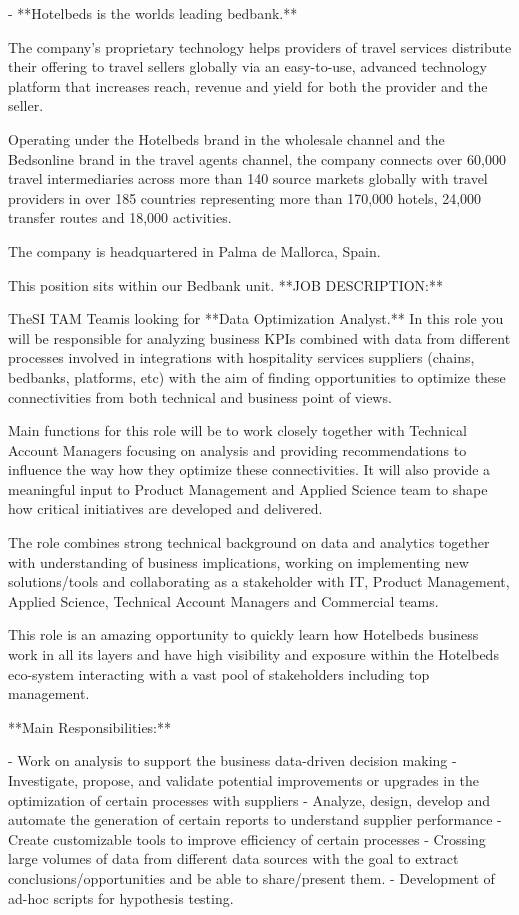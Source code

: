 - **Hotelbeds is the worlds leading bedbank.**

  The company’s proprietary technology helps providers of travel services distribute their offering to travel sellers globally via an easy-to-use, advanced technology platform that increases reach, revenue and yield for both the provider and the seller.

  Operating under the Hotelbeds brand in the wholesale channel and the Bedsonline brand in the travel agents channel, the company connects over 60,000 travel intermediaries across more than 140 source markets globally with travel providers in over 185 countries representing more than 170,000 hotels, 24,000 transfer routes and 18,000 activities.

  The company is headquartered in Palma de Mallorca, Spain.

  This position sits within our Bedbank unit. **JOB DESCRIPTION:**

  TheSI TAM Teamis looking for **Data Optimization Analyst.** In this role you will be responsible for analyzing business KPIs combined with data from different processes involved in integrations with hospitality services suppliers (chains, bedbanks, platforms, etc) with the aim of finding opportunities to optimize these connectivities from both technical and business point of views.

  Main functions for this role will be to work closely together with Technical Account Managers focusing on analysis and providing recommendations to influence the way how they optimize these connectivities. It will also provide a meaningful input to Product Management and Applied Science team to shape how critical initiatives are developed and delivered.

  The role combines strong technical background on data and analytics together with understanding of business implications, working on implementing new solutions/tools and collaborating as a stakeholder with IT, Product Management, Applied Science, Technical Account Managers and Commercial teams.

  This role is an amazing opportunity to quickly learn how Hotelbeds business work in all its layers and have high visibility and exposure within the Hotelbeds eco-system interacting with a vast pool of stakeholders including top management.

  **Main Responsibilities:**

  - Work on analysis to support the business data-driven decision making
  - Investigate, propose, and validate potential improvements or upgrades in the optimization of certain processes with suppliers
  - Analyze, design, develop and automate the generation of certain reports to understand supplier performance
  - Create customizable tools to improve efficiency of certain processes
  - Crossing large volumes of data from different data sources with the goal to extract conclusions/opportunities and be able to share/present them.
  - Development of ad-hoc scripts for hypothesis testing.

